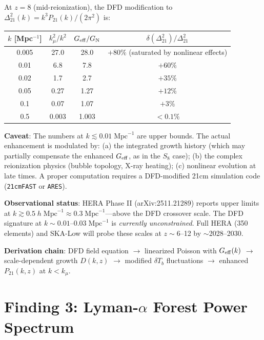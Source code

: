 \documentclass[11pt,a4paper]{article}
\newcounter{findingctr}
\newenvironment{finding}[1][]{%
  \refstepcounter{findingctr}%
  \begin{tcolorbox}[colback=blue!3!white, colframe=blue!50!black,
    title=\textbf{Finding \thefindingctr: #1}]
}{%
  \end{tcolorbox}%
}
\newcommand{\GN}{G_{\rm N}}
\newcommand{\Geff}{G_{\rm eff}}
\newcommand{\kmu}{k_\mu}
\begin{document}
\begin{finding}[21cm Power Spectrum Scale-Dependent Enhancement]
\label{find:21cm}
At $z = 8$ (mid-reionization), the DFD modification to
$\Delta^2_{21}(k) = k^3 P_{21}(k) / (2\pi^2)$ is:

\begin{center}
\begin{tabular}{cccc}
\toprule
$k$ [Mpc$^{-1}$] & $\kmu^2/k^2$ & $\Geff/\GN$ &
  $\delta(\Delta^2_{21})/\Delta^2_{21}$ \\
\midrule
0.005 & 27.0 & 28.0 & $+80\%$ (saturated by nonlinear effects) \\
0.01 & 6.8 & 7.8 & $+60\%$ \\
0.02 & 1.7 & 2.7 & $+35\%$ \\
0.05 & 0.27 & 1.27 & $+12\%$ \\
0.1 & 0.07 & 1.07 & $+3\%$ \\
0.5 & 0.003 & 1.003 & $<0.1\%$ \\
\bottomrule
\end{tabular}
\end{center}

\textbf{Caveat}: The numbers at $k \lesssim 0.01\;\text{Mpc}^{-1}$ are
upper bounds. The actual enhancement is modulated by:
(a) the integrated growth history (which may partially compensate the
enhanced $\Geff$, as in the $S_8$ case);
(b) the complex reionization physics (bubble topology, X-ray heating);
(c) nonlinear evolution at late times.
A proper computation requires a DFD-modified 21cm simulation code
(\texttt{21cmFAST} or \texttt{ARES}).

\textbf{Observational status}: HERA Phase II (arXiv:2511.21289) reports
upper limits at $k \gtrsim 0.5\;h\;\text{Mpc}^{-1} \approx
0.3\;\text{Mpc}^{-1}$---above the DFD crossover scale. The DFD signature
at $k \sim 0.01$--$0.03\;\text{Mpc}^{-1}$ is \emph{currently
unconstrained}. Full HERA (350 elements) and SKA-Low will probe these
scales at $z \sim 6$--12 by $\sim$2028--2030.

\textbf{Derivation chain}: DFD field equation $\to$ linearized Poisson
with $\Geff(k)$ $\to$ scale-dependent growth $D(k,z)$ $\to$ modified
$\delta T_b$ fluctuations $\to$ enhanced $P_{21}(k,z)$ at $k < \kmu$.
\end{finding}


\part{Finding 3: Lyman-$\alpha$ Forest Power Spectrum}
\label{sec:lya-forest}
\end{document}
